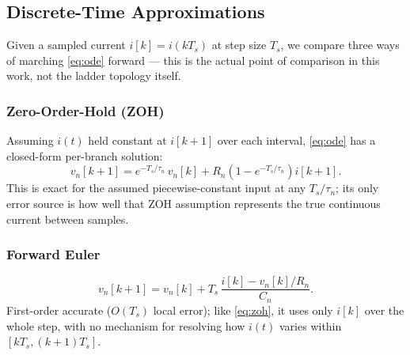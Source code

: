 \documentclass[conference]{IEEEtran}
\begin{document}
		\subsection{Discrete-Time Approximations}

	Given a sampled current $i[k] = i(kT_s)$ at step size $T_s$, we compare three ways of marching \eqref{eq:ode} forward — this is the actual point of comparison in this work, not the ladder topology itself.

	\subsubsection{Zero-Order-Hold (ZOH)}
	Assuming $i(t)$ held constant at $i[k+1]$ over each interval, \eqref{eq:ode} has a closed-form per-branch solution:
	\begin{equation}
		v_n[k+1] = e^{-T_s/\tau_n}\,v_n[k] + R_n\left(1-e^{-T_s/\tau_n}\right) i[k+1].
		\label{eq:zoh}
	\end{equation}
	This is exact for the assumed piecewise-constant input at any $T_s/\tau_n$; its only error source is how well that ZOH assumption represents the true continuous current between samples.

	\subsubsection{Forward Euler}
	\begin{equation}
		v_n[k+1] = v_n[k] + T_s\,\frac{i[k]-v_n[k]/R_n}{C_n}.
		\label{eq:euler}
	\end{equation}
	First-order accurate ($O(T_s)$ local error); like \eqref{eq:zoh}, it uses only $i[k]$ over the whole step, with no mechanism for resolving how $i(t)$ varies within $[kT_s,(k+1)T_s]$.
\end{document}
